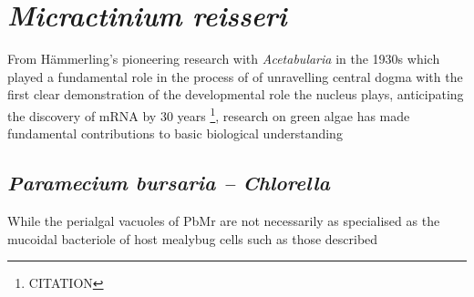 \section{\textit{Micractinium reisseri}}
From H\"ammerling's pioneering research with \textit{Acetabularia} in the 1930s 
which played a fundamental role in the process of 
of unravelling central dogma with the first clear demonstration of the 
developmental role the nucleus plays, anticipating the discovery of mRNA by 30 years
\footnote{CITATION}, research on green algae has made fundamental contributions
to basic biological understanding

\subsection{\textit{Paramecium bursaria – Chlorella}}

While the perialgal vacuoles of PbMr are not necessarily as specialised as the 
mucoidal bacteriole of host mealybug cells such as those described \citep{vonDohlen2001}

